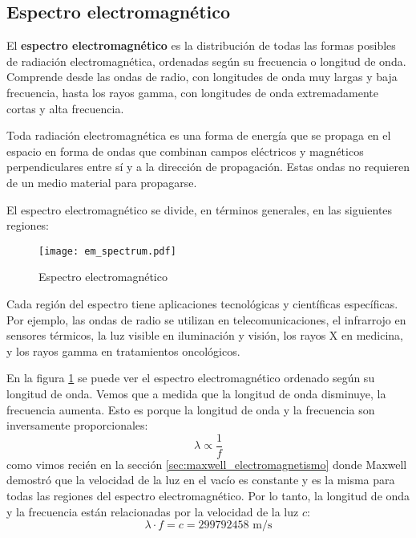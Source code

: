 \subsection{Espectro electromagnético}

El \textbf{espectro electromagnético} es la distribución de todas las formas posibles de radiación electromagnética, ordenadas según su frecuencia o longitud de onda. Comprende desde las ondas de radio, con longitudes de onda muy largas y baja frecuencia, hasta los rayos gamma, con longitudes de onda extremadamente cortas y alta frecuencia.

Toda radiación electromagnética es una forma de energía que se propaga en el espacio en forma de ondas que combinan campos eléctricos y magnéticos perpendiculares entre sí y a la dirección de propagación. Estas ondas no requieren de un medio material para propagarse.

El espectro electromagnético se divide, en términos generales, en las siguientes regiones:

\begin{figure}[ht]
  \centering
  \texttt{[image: em\_spectrum.pdf]}
  \caption{Espectro electromagnético}
  \label{fig:em_spectrum}
\end{figure}

Cada región del espectro tiene aplicaciones tecnológicas y científicas específicas. Por ejemplo, las ondas de radio se utilizan en telecomunicaciones, el infrarrojo en sensores térmicos, la luz visible en iluminación y visión, los rayos X en medicina, y los rayos gamma en tratamientos oncológicos.

En la figura \ref{fig:em_spectrum} se puede ver el espectro electromagnético ordenado según su longitud de onda. Vemos que a medida que la longitud de onda disminuye, la frecuencia aumenta. Esto es porque la longitud de onda y la frecuencia son inversamente proporcionales:
\[
  \lambda \propto \frac{1}{f}
\]
como vimos recién en la sección \ref{sec:maxwell_electromagnetismo} donde Maxwell demostró que la velocidad de la luz en el vacío es constante y es la misma para todas las regiones del espectro electromagnético. Por lo tanto, la longitud de onda y la frecuencia están relacionadas por la velocidad de la luz \(c\):
\[
  \lambda \cdot f = c = 299792458 \text{ m/s}
\]